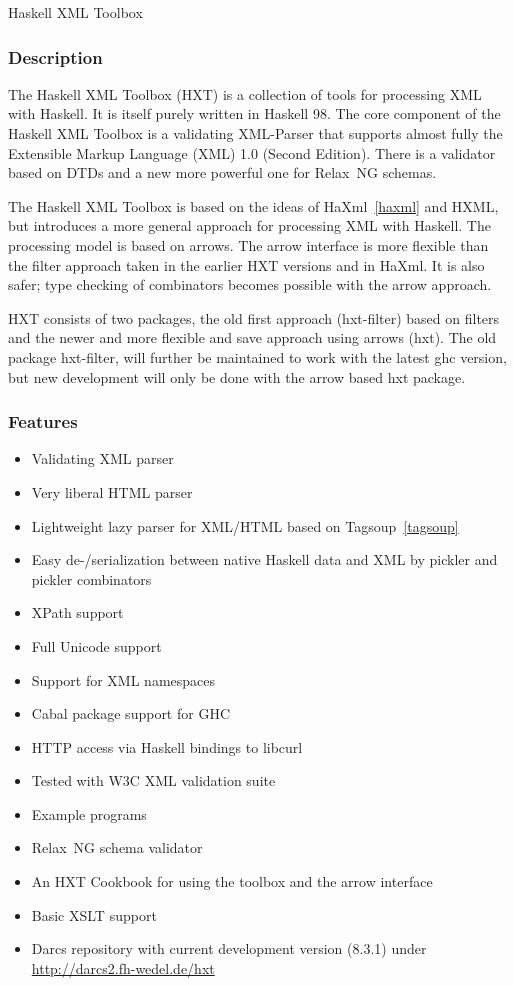 \begin{hcarentry}[updated]{Haskell XML Toolbox}
\label{hxt}
\makeheader

\subsubsection*{Description}

The Haskell XML Toolbox (HXT) is a collection of tools for processing XML with
Haskell. It is itself purely written in Haskell 98. The core component of the
Haskell XML Toolbox is a validating XML-Parser that supports
almost fully the Extensible Markup Language (XML) 1.0 (Second Edition).
There is a validator based on DTDs and a new more powerful one for
Relax~NG schemas.

The Haskell XML Toolbox is based on the ideas of HaXml~\cref{haxml} and HXML,
but introduces a more general approach for processing XML with Haskell.
The processing model is based on arrows. The arrow interface is more flexible
than the filter approach taken in the earlier HXT versions and in HaXml.
It is also safer; type checking of combinators becomes possible with the arrow
approach.

HXT consists of two packages, the old first approach (hxt-filter)
based on filters and the newer and more flexible and save approach
using arrows (hxt). The old package hxt-filter, will further be maintained to work
with the latest ghc version, but new development will only be done
with the arrow based hxt package.

\subsubsection*{Features}

\begin{itemize}
\item Validating XML parser
\item Very liberal HTML parser
\item Lightweight lazy parser for XML/HTML based on Tagsoup~\cref{tagsoup}
\item Easy de-/serialization between native Haskell data and XML by pickler and pickler combinators
\item XPath support
\item Full Unicode support
\item Support for XML namespaces
\item Cabal package support for GHC
\item HTTP access via Haskell bindings to libcurl
\item Tested with W3C XML validation suite
\item Example programs
\item Relax~NG schema validator
\item An HXT Cookbook for using the toolbox and the arrow interface
\item Basic XSLT support
\item Darcs repository with current development version (8.3.1) under
  \url{http://darcs2.fh-wedel.de/hxt}
\end{itemize}


\end{hcarentry}
